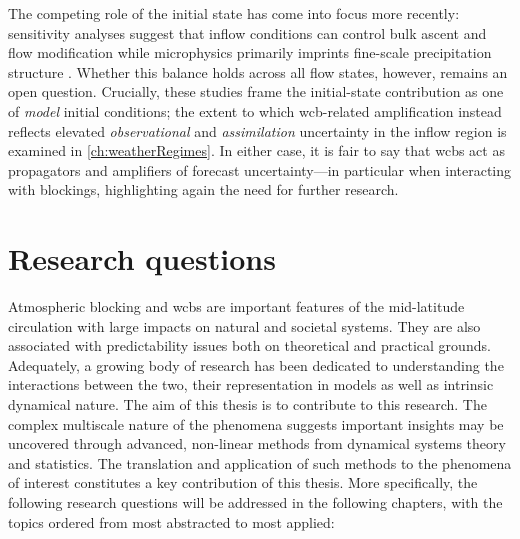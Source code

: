 The competing role of the initial state has come into
focus more recently: sensitivity analyses suggest that inflow conditions can
control bulk ascent and flow modification while microphysics primarily
imprints fine-scale precipitation structure
\parencite{hieronymusAlgorithmicDifferentiationSensitivity2022,
    oertelSensitivitiesWarmConveyor2025}. Whether this balance holds across all
flow states, however, remains an open question. Crucially, these studies
frame the initial-state contribution as one of \emph{model} initial
conditions; the extent to which \gls{wcb}-related amplification instead
reflects elevated \emph{observational} and \emph{assimilation} uncertainty
in the inflow region is examined in \cref{ch:weatherRegimes}. In either case,
it is fair to say that \glspl{wcb} act as propagators and amplifiers of
forecast uncertainty---in particular when interacting with blockings,
highlighting again the need for further research.


\section{Research questions}\label{sec:intro_roadmap}

Atmospheric blocking and \glspl{wcb} are important features of the mid-latitude
circulation with large impacts on natural and societal systems. They are also
associated with predictability issues both on theoretical and practical
grounds. Adequately, a growing body of research has been dedicated to
understanding the interactions between the two, their representation in models
as well as intrinsic dynamical nature. The aim of this thesis is to contribute
to this research. The complex multiscale nature of the phenomena suggests
important insights may be uncovered through advanced, non-linear methods from
dynamical systems theory and statistics. The translation and application of
such methods to the phenomena of interest constitutes a key contribution of
this thesis. More specifically, the following research questions will be
addressed in the following chapters, with the topics ordered from most
abstracted to most applied:

